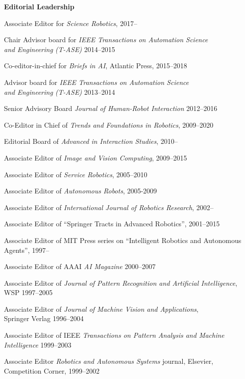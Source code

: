\documentclass{article}
\begin{document}
\begin{cv}
\begin{cvlist} {\bf Editorial Leadership} 
  \item Associate Editor for {\em Science Robotics}, \cftdotfill{\cftdotsep} 2017--
  \item Chair Advisor board for {\em IEEE Transactions on Automation
    Science\\ and Engineering (T-ASE)}  \cftdotfill{\cftdotsep} 2014--2015
  \item Co-editor-in-chief for {\em Briefs in AI}, Atlantic Press,
    \cftdotfill{\cftdotsep}  2015--2018
  \item Advisor board for {\em IEEE Transactions on Automation
    Science\\ and Engineering (T-ASE)} \cftdotfill{\cftdotsep} 2013--2014
  \item Senior Advisory Board {\em Journal of Human-Robot Interaction}
    \cftdotfill{\cftdotsep} 2012--2016
  \item Co-Editor in Chief of {\em Trends and Foundations in
    Robotics}, \cftdotfill{\cftdotsep} 2009--2020
  \item Editorial Board of {\em Advanced in Interaction
    Studies},\cftdotfill{\cftdotsep} 2010--
  \item Associate Editor of {\em Image and Vision
    Computing},\cftdotfill{\cftdotsep} 2009--2015
  \item Associate Editor of {\em Service Robotics},
    \cftdotfill{\cftdotsep} 2005--2010
  \item Associate Editor of {\em Autonomous Robots},
    \cftdotfill{\cftdotsep} 2005-2009
  \item Associate Editor of {\em International Journal of Robotics
    Research},\cftdotfill{\cftdotsep} 2002--
  \item Associate Editor of ``Springer Tracts in Advanced
    Robotics'',\cftdotfill{\cftdotsep} 2001--2015
  \item Associate Editor of MIT Press series on ``Intelligent Robotics
    and Autonomous\\ Agents'',\cftdotfill{\cftdotsep} 1997--
  \item Associate Editor of AAAI {\em AI
    Magazine}\cftdotfill{\cftdotsep} 2000--2007
  \item Associate Editor of {\em Journal of Pattern Recognition and
    Artificial Intelligence},\\ WSP \cftdotfill{\cftdotsep} 1997--2005
  \item Associate Editor of {\em Journal of Machine Vision and
    Applications}, \\Springer Verlag \cftdotfill{\cftdotsep}
    1996--2004
  \item Associate Editor of IEEE {\em Transactions on Pattern Analysis
    and Machine\\ Intelligence} \cftdotfill{\cftdotsep} 1999--2003
  \item Associate Editor {\em Robotics and Autonomous Systems}
    journal, Elsevier, \\Competition Corner, \cftdotfill{\cftdotsep}
    1999--2002
\end{cvlist}


\end{cv}
\end{document}
